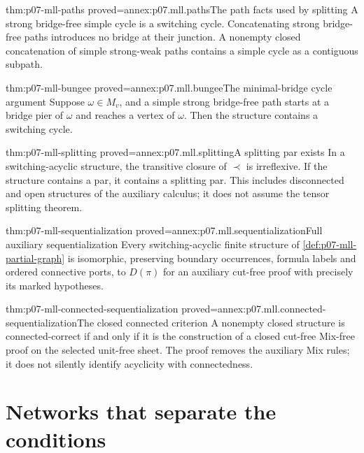 \begin{hblemma}{thm:p07-mll-paths}
 {proved=annex:p07.mll.paths}{The path facts used by splitting}
A strong bridge-free simple cycle is a switching cycle. Concatenating
strong bridge-free paths introduces no bridge at their junction.
A nonempty closed concatenation of simple strong-weak paths contains
a simple cycle as a contiguous subpath.
\end{hblemma}

\begin{hblemma}{thm:p07-mll-bungee}
 {proved=annex:p07.mll.bungee}{The minimal-bridge cycle argument}
Suppose \(\omega\in M_v\), and a simple strong bridge-free path starts
at a bridge pier of \(\omega\) and reaches a vertex of \(\omega\).
Then the structure contains a switching cycle.
\end{hblemma}

\begin{hblemma}{thm:p07-mll-splitting}
 {proved=annex:p07.mll.splitting}{A splitting par exists}
In a switching-acyclic structure, the transitive closure of \(\prec\)
is irreflexive. If the structure contains a par, it contains a splitting
par. This includes disconnected and open structures of the auxiliary
calculus; it does not assume the tensor splitting theorem.
\end{hblemma}

\begin{hbtheorem}{thm:p07-mll-sequentialization}
 {proved=annex:p07.mll.sequentialization}{Full auxiliary sequentialization}
Every switching-acyclic finite structure of
\cref{def:p07-mll-partial-graph} is isomorphic, preserving boundary
occurrences, formula labels and ordered connective ports, to \(D(\pi)\)
for an auxiliary cut-free proof with precisely its marked hypotheses.
\end{hbtheorem}

\begin{hbcorollary}{thm:p07-mll-connected-sequentialization}
 {proved=annex:p07.mll.connected-sequentialization}{The closed connected criterion}
A nonempty closed structure is connected-correct if and only if it is
the construction of a closed cut-free Mix-free proof on the selected
unit-free sheet. The proof removes the auxiliary Mix rules; it does
not silently identify acyclicity with connectedness.
\end{hbcorollary}

\section{Networks that separate the conditions}
\label{sec:p07-mll-net-examples}


